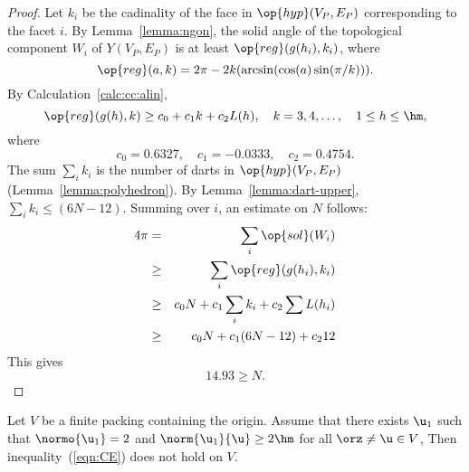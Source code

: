\begin{proof}
Let $k_i$ be the cadinality of the face in $\op{hyp}(V_P,E_P)$
corresponding to the facet $i$.  By Lemma~\ref{lemma:ngon}, the solid
angle of the topological component $W_i$ of $Y(V_P,E_P)$ is at least
$\op{reg}(g(h_i),k_i)$, where %
%
%
\begin{displaymath}
\op{reg}(a,k) = 2\pi - 2 k (\arcsin(\cos(a)\sin(\pi/k))).
\end{displaymath}
By Calculation~\ref{calc:cc:alin}, %
\begin{displaymath}
\op{reg}(g(h),k) \ge c_0 + c_1 k + c_2 L(h),\quad
k = 3,4,\ldots,\quad 1\le h\le \hm,
\end{displaymath}
where
\begin{displaymath}c_0 = 0.6327,\quad c_1 = -0.0333,\quad c_2 =
0.4754.\end{displaymath} The sum $\sum_i k_i$ is the number of darts
in $\op{hyp}(V_P,E_P)$ (Lemma~\ref{lemma:polyhedron}).  By
Lemma~\ref{lemma:dart-upper}, $\sum_i k_i \le (6N-12)$.  Summing over
$i$, an estimate on $N$ follows: %
%
\begin{eqnarray*}
4\pi &=& \sum_i\op{sol}(W_i)\\
&\ge& \sum_i \op{reg}(g(h_i),k_i) \\
&\ge& c_0 N +c_1\sum_i k_i + c_2 \sum L(h_i)\\
&\ge& c_0 N +c_1 (6N-12) + c_2 12\\
\end{eqnarray*}
This gives
\begin{displaymath}
14.93 \ge N.
\end{displaymath}
\end{proof} 


\begin{lemma}\label{300}\label{lemma:D'}  
Let $ V$ be a finite packing containing the origin.
Assume that there exists $ \u_1$ such that $\normo{ \u_1}=2$ and
$\norm{ \u_1}{ \u}\ge 2\hm$ for all $\orz\ne \u\in V$,
Then  inequality~(\ref{eqn:CE}) does not hold on $ V$.
\end{lemma}

